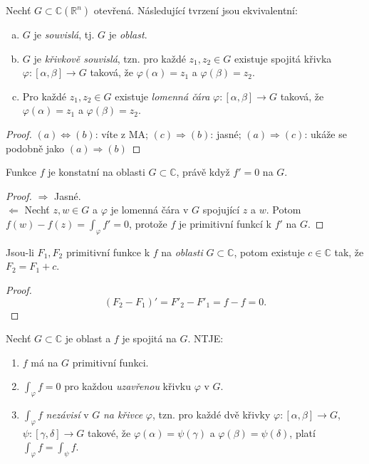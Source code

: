 \begin{reminder}[Souvislost]
Nechť $G\subset\mathbb{C}(\mathbb{R}^n)$ otevřená. Následující tvrzení jsou ekvivalentní:

\begin{enumerate}[(a)]
    \item $G$ je \emph{souvislá}, tj. $G$ je \emph{oblast}.
    \item $G$ je \emph{křivkově souvislá}, tzn. pro každé $z_1,z_2\in G$ existuje spojitá křivka $\varphi:[\alpha,\beta]\rightarrow G$ taková, že $\varphi(\alpha)=z_1$ a $\varphi(\beta)=z_2$.
    \item Pro každé $z_1,z_2\in G$ existuje \emph{lomenná čára} $\varphi:[\alpha,\beta]\rightarrow G$ taková, že $\varphi(\alpha)=z_1$ a $\varphi(\beta)=z_2$.
\end{enumerate}
\end{reminder}
\begin{proof}
$(a)\iff (b)$: víte z MA; $(c)\Rightarrow(b)$: jasné; $(a)\Rightarrow(c)$: ukáže se podobně jako $(a)\Rightarrow (b)$
\end{proof}

\begin{theorem}
Funkce $f$ je konstatní na oblasti $G\subset\mathbb{C}$, právě když $f'=0$ na $G$.
\end{theorem}
\begin{proof}
$\Rightarrow$ Jasné.\\
$\Leftarrow$ Nechť $z,w\in G$ a $\varphi$ je lomenná čára v $G$ spojující $z$ a $w$. Potom $f(w)-f(z)=\int_\varphi f'=0$, protože $f$ je primitivní funkcí k $f'$ na $G$.
\end{proof}

\begin{consequence}
Jsou-li $F_1,F_2$ primitivní funkce k $f$ na \emph{oblasti} $G\subset\mathbb{C}$, potom existuje $c\in\mathbb{C}$ tak, že $F_2=F_1+c$.
\end{consequence}

\begin{proof}
$$(F_2-F_1)'=F'_2-F'_1=f-f=0\text{.}$$
\end{proof}

\begin{theorem}[O existenci PF]\label{thm:oExistenciPF}
Nechť $G\subset\mathbb{C}$ je oblast a $f$ je spojitá na $G$. NTJE:
\begin{enumerate}
    \item $f$ má na $G$ primitivní funkci.
    \item $\int_\varphi f=0$ pro každou \emph{uzavřenou} křivku $\varphi$ v $G$.
    \item $\int_\varphi f$ \emph{nezávisí} v $G$ \emph{na křivce} $\varphi$, tzn. pro každé dvě křivky $\varphi:[\alpha,\beta]\rightarrow G$, $\psi:[\gamma,\delta]\rightarrow G$ takové, že $\varphi(\alpha)=\psi(\gamma)$ a $\varphi(\beta)=\psi(\delta)$, platí $\int_\varphi f = \int_\psi f$.
\end{enumerate}
\end{theorem}

